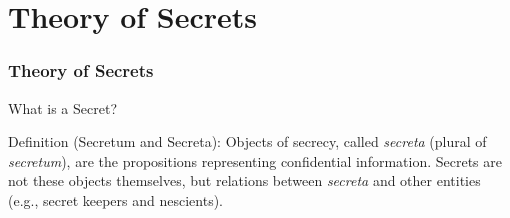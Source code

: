 \documentclass[aspectratio=169]{beamer}
\let\mathcal\relax
\begin{document}


\section{Theory of Secrets}

\begin{frame}
\frametitle{Theory of Secrets}

\Large What is a Secret?

\vspace{1em}

\begin{block}{Definition (Secretum and Secreta):}  
Objects of secrecy, called \emph{secreta} (plural of \emph{secretum}), are the propositions representing confidential information.  
Secrets are not these objects themselves, but relations between \emph{secreta} and other entities (e.g., secret keepers and nescients).
\end{block}
\end{frame}
\end{document}
